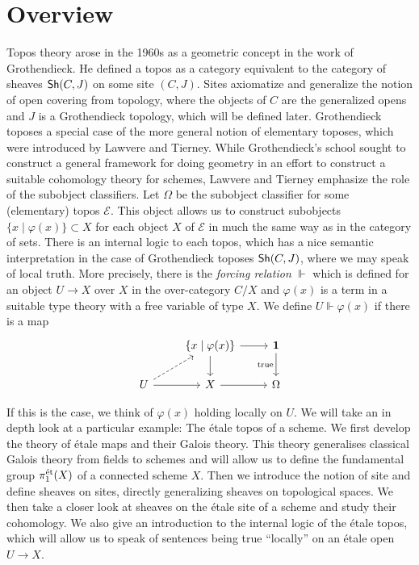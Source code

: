 \section{Overview}
Topos theory arose in the 1960s as a geometric concept in the work of Grothendieck. He defined a topos as a category equivalent to the category of sheaves $\operatorname{\mathsf{Sh}}(C,J)$ on some site $(C,J)$. Sites axiomatize and generalize the notion of open covering from topology, where the objects of $C$ are the generalized opens and $J$ is a Grothendieck topology, which will be defined later. Grothendieck toposes a special case of the more general notion of elementary toposes, which were introduced by Lawvere and Tierney. While Grothendieck's school sought to construct a general framework for doing geometry in an effort to construct a suitable cohomology theory for schemes, Lawvere and Tierney emphasize the role of the subobject classifiers. Let $\Omega$ be the subobject classifier for some (elementary) topos $\mathcal{E}$. This object allows us to construct subobjects $\{x \mid \varphi(x)\} \subset X$ for each object $X$ of $\mathcal{E}$ in much the same way as in the category of sets. There is an internal logic to each topos, which has a nice semantic interpretation in the case of Grothendieck toposes $\operatorname{\mathsf{Sh}}(C,J)$, where we may speak of local truth. More precisely, there is the \textit{forcing relation} $\Vdash$ which is defined for an object $U \to X$ over $X$ in the over-category $C/X$ and $\varphi(x)$ is a term in a suitable type theory with a free variable of type $X$. We define $U \Vdash \varphi(x)$ if there is a map
\[
	\begin{tikzcd}
		& {\{x \mid \varphi(x)\}} & {\mathbf{1}} \\
		U & X & \Omega
		\arrow[from=2-1, to=2-2]
		\arrow[dashed, from=2-1, to=1-2]
		\arrow[from=1-2, to=1-3]
		\arrow["{\text{true}}"', from=1-3, to=2-3]
		\arrow[from=1-2, to=2-2]
		\arrow[from=2-2, to=2-3]
	\end{tikzcd}
\]



If this is the case, we think of $\varphi(x)$ holding locally on $U$. We will take an in depth look at a particular example: The \'etale topos of a scheme. We first develop the theory of \'etale maps and their Galois theory. This theory generalises classical Galois theory from fields to schemes and will allow us to define the fundamental group $\pi_1^{\text{\'et}}(X)$ of a connected scheme $X$. Then we introduce the notion of site and define sheaves on sites, directly generalizing sheaves on topological spaces. We then take a closer look at sheaves on the \'etale site of a scheme and study their cohomology. We also give an introduction to the internal logic of the \'etale topos, which will allow us to speak of sentences being true ``locally'' on an \'etale open $U \to X$.

